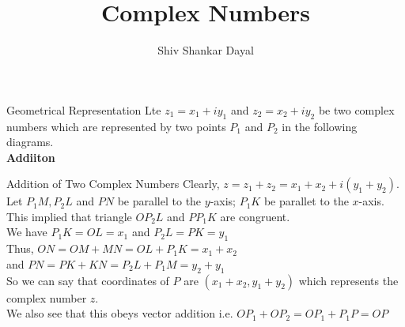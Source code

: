 \documentclass[aspectratio=169,8pt]{beamer}
\title{Complex Numbers}
\author[Shiv Shankar Dayal]{Shiv Shankar Dayal}
\begin{document}
\begin{frame}
  \titlepage
\end{frame}
\begin{frame}{Geometrical Representation}
  Lte $z_1 = x_1 + iy_1$ and $z_2 = x_2 + iy_2$ be two complex numbers which
  are represented by two points $P_1$ and $P_2$ in the following diagrams.\\
  \vspace*{0.2cm}
  \textbf{\large{Addiiton}}
  \begin{center}
  \end{center}
\end{frame}
\begin{frame}{Addition of Two Complex Numbers}
  Clearly, $z = z_1 + z_2 = x_1 + x_2 + i(y_1 + y_2)$.\\
  \vspace*{0.2cm}
  Let $P_1M, P_2L$ and $PN$ be parallel to the $y$-axis; $P_1K$ be parallet to
  the $x$-axis. This implied that triangle $OP_2L$ and $PP_1K$ are congruent.\\
  \vspace*{0.2cm}
  We have $P_1K = OL = x_1$ and $P_2L = PK = y_1$\\
  \vspace*{0.2cm}
  Thus, $ON = OM + MN = OL + P_1K = x_1 + x_2$\\
  \vspace*{0.2cm}
  and $PN = PK + KN = P_2L + P_1M = y_2 + y_1$\\
  \vspace*{0.2cm}
  So we can say that coordinates of $P$ are $(x_1 + x_2, y_1 + y_2)$ which
  represents the complex number $z.$\\
  \vspace*{0.2cm}
  We also see that this obeys vector addition i.e. $OP_1 + OP_2 = OP_1 + P_1P = OP$
\end{frame}
\end{document}
